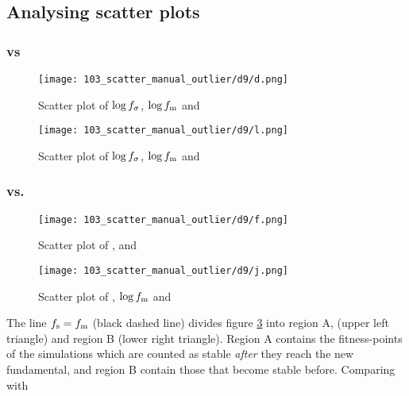 \subsection{Analysing scatter plots}\label{section:d9_analysing_scatter_plots}

\subsubsection{\roundstable vs \stdev}
\begin{figure}
\centering
\texttt{[image: 103\_scatter\_manual\_outlier/d9/d.png]}
\caption{Scatter plot of $\log f_\sigma$, $\log f_\text{m}$ and \timetoreachnewfundamental}
\label{figure:d9_scatter_fitness_inliers_logs_logr_t}
\end{figure}

\begin{figure}
\centering
\texttt{[image: 103\_scatter\_manual\_outlier/d9/l.png]}
\caption{Scatter plot of $\log f_\sigma$, $\log f_\text{m}$ and \overshoot}
\label{figure:d9_scatter_fitness_inliers_logs_logr_o}
\end{figure}



\subsubsection{\roundstable vs. \timetoreachnewfundamental}
\begin{figure}
\centering
\texttt{[image: 103\_scatter\_manual\_outlier/d9/f.png]}
\caption{Scatter plot of \roundstable, \timetoreachnewfundamental and \stdev}
\label{figure:d9_scatter_fitness_inliers_t_r_logs}
\end{figure}
\begin{figure}
\centering
\texttt{[image: 103\_scatter\_manual\_outlier/d9/j.png]}
\caption{Scatter plot of \overshoot, $\log f_\text{m}$ and \timetoreachnewfundamental}
\label{figure:d9_scatter_fitness_inliers_t_r_o}
\end{figure}

The line $f_\text{s} = f_\text{m}$ (black dashed line) divides figure \ref{figure:d9_scatter_fitness_inliers_t_r_logs} into region A, (upper left triangle) and region B (lower right triangle). Region A contains the fitness-points of the simulations which are counted as stable \textit{after} they reach the new fundamental, and region B contain those that become stable before. Comparing with 



